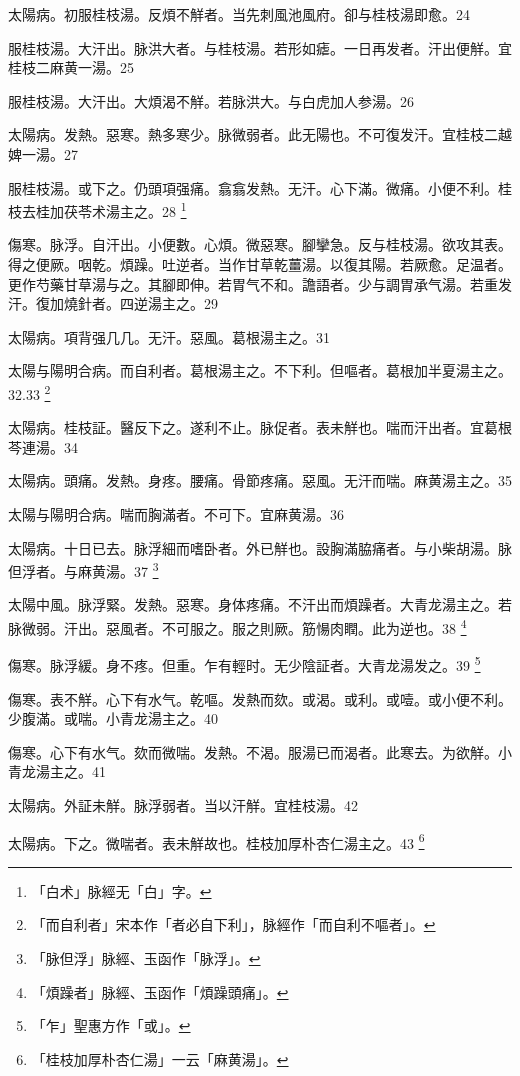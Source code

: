 \documentclass[12pt,twoside,UTF8,b5paper]{ctexbook}
\begin{document}
太陽病。初服桂枝湯。反煩不觧者。当先刺風池風府。卻与桂枝湯即愈。24

服桂枝湯。大汗出。脉洪大者。与桂枝湯。若形如瘧。一日再发者。汗出便觧。宜桂枝二麻黄一湯。25

服桂枝湯。大汗出。大煩渴不觧。若脉洪大。与白虎{加人参}湯。26

太陽病。发熱。惡寒。熱多寒少。脉微弱者。此无陽也。不可{復}发汗。{宜桂枝二越婢一湯。}27

服桂枝湯。{或}下之。仍頭項强痛。翕翕发熱。无汗。心下滿。微痛。小便不利。桂枝去桂加茯苓术湯主之。28
	\footnote{「白术」脉經无「白」字。}

傷寒。脉浮。自汗出。小便數。心煩。微惡寒。腳攣急。反与桂枝湯。欲攻其表。得之便厥。咽乾。煩躁。吐逆者。当作甘草乾薑湯。以復其陽。若厥愈。足温者。更作芍藥甘草湯与之。其腳即伸。若胃气不和。譫語者。少与{調胃}承气湯。若重发汗。復加燒針者。四逆湯主之。29

太陽病。項背强几几。无汗。惡風。葛根湯主之。31

太陽与陽明合病。而自利{者}。葛根湯主之。不下利。但嘔者。葛根加半夏湯主之。32.33
	\footnote{「而自利者」宋本作「者必自下利」，脉經作「而自利不嘔者」。}

太陽病。桂枝証。醫反下之。遂利不止。脉促者。表未觧也。喘而汗出者。宜葛根芩連湯。34

太陽病。頭痛。发熱。身疼。腰痛。骨節疼痛。惡風。无汗而喘。麻黄湯主之。35

太陽与陽明合病。喘而胸滿者。不可下。宜麻黄湯。36

太陽病。十日已去。脉浮細而嗜卧者。外已觧也。設胸滿脇痛者。与小柴胡湯。脉{但}浮者。与麻黄湯。37
	\footnote{「脉但浮」脉經、玉函作「脉浮」。}

太陽中風。脉浮緊。发熱。惡寒。身{体}疼痛。不汗出而煩躁者。大青龙湯主之。若脉微弱。汗出。惡風者。不可服之。服之則厥。筋愓肉瞤。此为逆也。38
	\footnote{「煩躁者」脉經、玉函作「煩躁頭痛」。}

傷寒。脉浮緩。身不疼。但重。乍有輕时。无少陰証者。大青龙湯发之。39
	\footnote{「乍」聖惠方作「或」。}

傷寒。表不觧。心下有水气。乾嘔。发熱而欬。或渴。或利。或噎。或小便不利。少腹滿。或喘。小青龙湯主之。40

傷寒。心下有水气。欬而微喘。发熱。不渴。服湯已而渴者。此寒去。为欲觧。小青龙湯主之。41

太陽病。外証未觧。脉浮弱者。当以汗觧。宜桂枝湯。42

太陽病。下之。微喘者。表未觧故也。桂枝{加厚朴杏仁}湯主之。43
	\footnote{「桂枝加厚朴杏仁湯」一云「麻黄湯」。}
\end{document}
